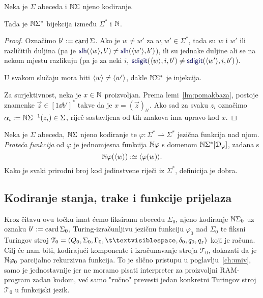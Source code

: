 \begin{propozicija}[{name=[bijektivnost kodiranja riječi]}]\label{pp:bijkr}
Neka je $\Sigma$ abeceda i ${\mathbb N}\Sigma$ njeno kodiranje.

    Tada je ${\mathbb N}\Sigma^*$ bijekcija između $\Sigma^*$ i ${\mathbb N}$.
\end{propozicija}
\begin{proof}
Označimo $b':=\operatorname{card}\Sigma$. Ako je $w\ne w'$ za $w,w'\in\Sigma^*$, tada su $w$ i $w'$ ili različitih duljina (pa je $\f{slh}(\kr w,b')\ne\f{slh}(\kr{w'},b')$), ili su jednake duljine ali se na nekom mjestu razlikuju (pa je za neki $i$, $\f{sdigit}(\kr w,i,b')\ne\f{sdigit}(\kr{w'},i,b')$).

U svakom slučaju mora biti $\langle w\rangle\ne\langle w'\rangle$, dakle ${\mathbb N}\Sigma^*$ je injekcija.

Za surjektivnost, neka je $x\in{\mathbb N}$ proizvoljan. Prema lemi~\ref{lm:pomakbaza}, postoje znamenke $\vec z\in[1\dd b']^*$ takve da je $x=(\vec z)_{b'}$. Ako sad za svaku $z_i$ označimo $\alpha_i:={\mathbb N}\Sigma^{-1}(z_i)\in\Sigma$, riječ sastavljena od tih znakova ima upravo kod $x$.
\end{proof}


\begin{definicija}[{name=[prateća funkcija jezične funkcije]}]\label{def:kodfi}
Neka je $\Sigma$ abeceda, ${\mathbb N}\Sigma$ njeno kodiranje te $\varphi:\Sigma^*\rightharpoonup\Sigma^*$ jezična funkcija nad njom. \emph{Prateća funkcija} od $\varphi$ je jednomjesna funkcija ${\mathbb N}\varphi$ s domenom ${\mathbb N}\Sigma^*[\mathcal D_{\varphi}]$, zadana s
\begin{equation}\label{eq:kodfidef}
    {\mathbb N}\varphi(\langle w\rangle):\simeq\langle\varphi(w)\rangle\text.
\end{equation}
Kako je svaki prirodni broj kod jedinstvene riječi iz $\Sigma^*$, definicija je dobra.
\end{definicija}

\subsection{Kodiranje stanja, trake i funkcije prijelaza}

Kroz čitavu ovu točku imat ćemo fiksiranu abecedu $\Sigma_0$, njeno kodiranje ${\mathbb N}\Sigma_0$ uz oznaku $b':=\operatorname{card}\Sigma_0$, Turing-izračunljivu jezičnu funkciju $\varphi_0$ nad $\Sigma_0$ te fiksni Turingov stroj $\mathcal T_0=(Q_0,\Sigma_0,\Gamma_0,\bl,\delta_0,q_0,q_z)$ koji je računa. Cilj će nam biti, kodirajući komponente i izračunavanje stroja $\mathcal T_0$, dokazati da je ${\mathbb N}\varphi_0$ parcijalno rekurzivna funkcija. To je slično pristupu u poglavlju~\ref{ch:univ}, samo je jednostavnije jer ne moramo pisati interpreter za proizvoljni RAM-program zadan kodom, već samo "ručno" prevesti jedan konkretni Turingov stroj $\mathcal T_0$ u funkcijski jezik.

